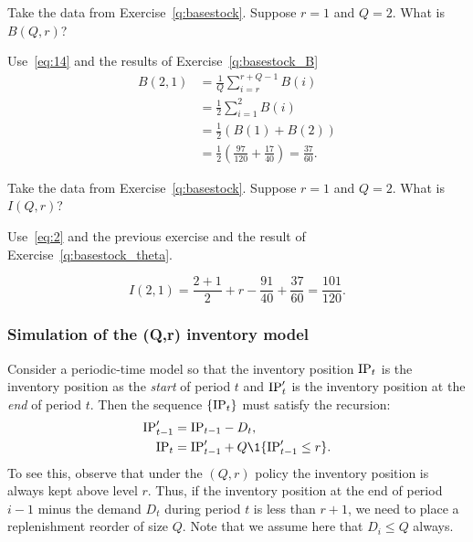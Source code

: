 \begin{question}
  Take the data from Exercise~\ref{q:basestock}. Suppose $r=1$ and $Q=2$. What is $B(Q,r)$?
\end{question}
\begin{solution}
Use~\eqref{eq:14} and the results of Exercise~\ref{q:basestock_B}
  \begin{equation*}
    \begin{split}
      B(2,1)
&= \frac1Q \sum_{i=r}^{r+Q-1} B(i) \\
&= \frac12 \sum_{i=1}^{2} B(i) \\
&= \frac12 (B(1) + B(2)) \\
&= \frac12 \left(\frac{97}{120} + \frac{17}{40}\right) = \frac{37}{60}.
\end{split}
\end{equation*}
\end{solution}


\begin{question}
  Take the data from Exercise~\ref{q:basestock}. Suppose $r=1$ and $Q=2$. What is $I(Q,r)$?
\end{question}
\begin{solution}
  Use~\eqref{eq:2} and the previous exercise and the result of Exercise~\ref{q:basestock_theta}.

  \begin{equation*}
    I(2,1)  = \frac{2+1}2 + r - \frac{91}{40}+ \frac{37}{60} = \frac{101}{120}.
  \end{equation*}
\end{solution}


\subsubsection{Simulation of the (Q,r) inventory model}

Consider a periodic-time model so that the inventory position $\textrm{IP}_t$ is the inventory position as the \emph{start} of period $t$ and $\textrm{IP}_t'$
is the inventory position at the \emph{end} of period $t$. Then the sequence
$\{\textrm{IP}_t\}$ must satisfy the recursion:
\begin{align*}
  \IP_{t-1}' &= \IP_{t-1} - D_t, \\
  \IP_t &= \IP_{t-1}' + Q \1{\IP_{t-1}'\leq r}.
\end{align*}
To see this, observe that under the $(Q,r)$ policy the inventory
position is always kept above level $r$. Thus, if the inventory
position at the end of period $i-1$ minus the demand $D_t$ during
period $t$ is less than $r+1$, we need to place a replenishment
reorder of size $Q$.  Note that we assume here that $D_i\leq Q$ always.

